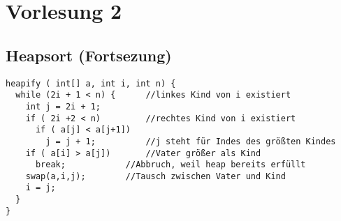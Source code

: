 \chapter{Vorlesung 2}
\section*{Heapsort (Fortsezung)}
\begin{lstlisting}
heapify ( int[] a, int i, int n) {
  while (2i + 1 < n) {		//linkes Kind von i existiert
    int j = 2i + 1;
    if ( 2i +2 < n)  		//rechtes Kind von i existiert
      if ( a[j] < a[j+1])
        j = j + 1;  		//j steht für Indes des größten Kindes
    if ( a[i] > a[j])  		//Vater größer als Kind
      break;  			//Abbruch, weil heap bereits erfüllt
    swap(a,i,j); 		//Tausch zwischen Vater und Kind
    i = j;
  }
}
\end{lstlisting}
